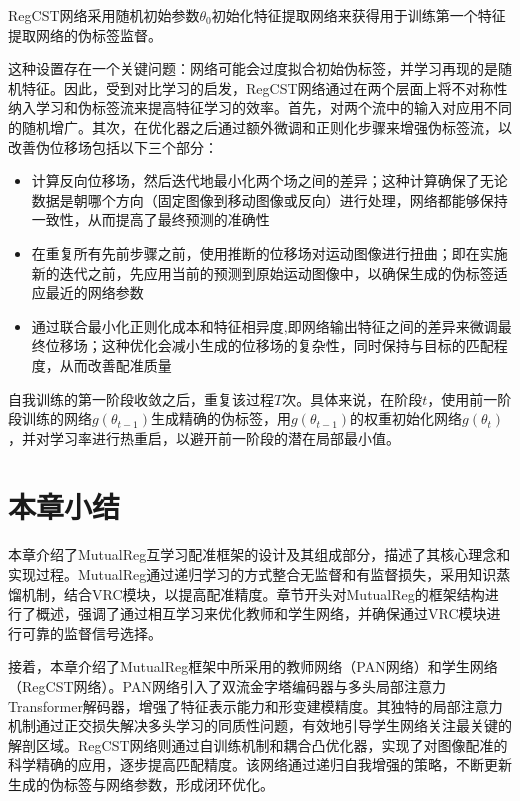 RegCST网络采用随机初始参数$\theta_0$初始化特征提取网络来获得用于训练第一个特征提取网络的伪标签监督。

这种设置存在一个关键问题：网络可能会过度拟合初始伪标签，并学习再现的是随机特征。因此，受到对比学习\cite{chen2021exploring}的启发，RegCST网络通过在两个层面上将不对称性纳入学习和伪标签流来提高特征学习的效率。首先，对两个流中的输入对应用不同的随机增广。其次，在优化器之后通过额外微调和正则化步骤来增强伪标签流，以改善伪位移场包括以下三个部分：

\begin{itemize}
    \item 计算反向位移场，然后迭代地最小化两个场之间的差异；这种计算确保了无论数据是朝哪个方向（固定图像到移动图像或反向）进行处理，网络都能够保持一致性，从而提高了最终预测的准确性
    \item 在重复所有先前步骤之前，使用推断的位移场对运动图像进行扭曲；即在实施新的迭代之前，先应用当前的预测到原始运动图像中，以确保生成的伪标签适应最近的网络参数
    \item 通过联合最小化正则化成本和特征相异度,即网络输出特征之间的差异来微调最终位移场；这种优化会减小生成的位移场的复杂性，同时保持与目标的匹配程度，从而改善配准质量
\end{itemize}

自我训练的第一阶段收敛之后，重复该过程$T$次。具体来说，在阶段$t$，使用前一阶段训练的网络$g(\theta_{t-1})$生成精确的伪标签，用$g(\theta_{t-1})$的权重初始化网络$g(\theta_{t})$，并对学习率进行热重启，以避开前一阶段的潜在局部最小值。

\section{本章小结}

本章介绍了MutualReg互学习配准框架的设计及其组成部分，描述了其核心理念和实现过程。MutualReg通过递归学习的方式整合无监督和有监督损失，采用知识蒸馏机制，结合VRC模块，以提高配准精度。章节开头对MutualReg的框架结构进行了概述，强调了通过相互学习来优化教师和学生网络，并确保通过VRC模块进行可靠的监督信号选择。

接着，本章介绍了MutualReg框架中所采用的教师网络（PAN网络）和学生网络（RegCST网络）。PAN网络引入了双流金字塔编码器与多头局部注意力Transformer解码器，增强了特征表示能力和形变建模精度。其独特的局部注意力机制通过正交损失解决多头学习的同质性问题，有效地引导学生网络关注最关键的解剖区域。RegCST网络则通过自训练机制和耦合凸优化器，实现了对图像配准的科学精确的应用，逐步提高匹配精度。该网络通过递归自我增强的策略，不断更新生成的伪标签与网络参数，形成闭环优化。

